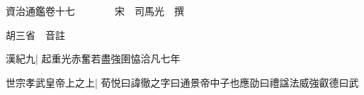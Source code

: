 






























































資治通鑑卷十七　　　　宋　司馬光　撰

胡三省　音註

漢紀九|{
	起重光赤奮若盡強圉恊洽凡七年}


世宗孝武皇帝上之上|{
	荀悦曰諱徹之字曰通景帝中子也應劭曰禮諡法威強叡德曰武}


